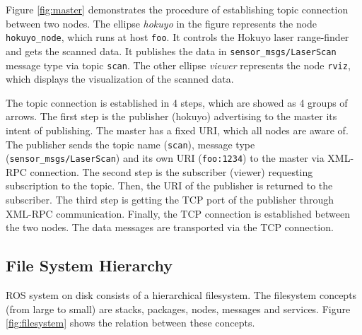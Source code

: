 \documentclass[a4paper, 10pt, conference]{ieeeconf}       %
\begin{document}
Figure \ref{fig:master} demonstrates the procedure of establishing topic connection between two nodes. The ellipse \emph{hokuyo} in the figure represents the node \texttt{hokuyo\_node}, which runs at host \texttt{foo}. It controls the Hokuyo laser range-finder and gets the scanned data. It publishes the data in \texttt{sensor\_msgs/LaserScan} message type via topic \texttt{scan}. The other ellipse \emph{viewer} represents the node \texttt{rviz}, which displays the visualization of the scanned data.

The topic connection is established in 4 steps, which are showed as 4 groups of arrows. The first step is the publisher (hokuyo) advertising to the master its intent of publishing. The master has a fixed URI, which all nodes are aware of. The publisher sends the topic name (\texttt{scan}), message type (\texttt{sensor\_msgs/LaserScan}) and its own URI (\texttt{foo:1234}) to the master via XML-RPC connection. The second step is the subscriber (viewer) requesting subscription to the topic. Then, the URI of the publisher is returned to the subscriber. The third step is getting the TCP port of the publisher through XML-RPC communication. Finally, the TCP connection is established between the two nodes. The data messages are transported via the TCP connection.

\subsection{File System Hierarchy}

ROS system on disk consists of a hierarchical filesystem. The filesystem concepts (from large to small) are stacks, packages, nodes, messages and services. Figure \ref{fig:filesystem} shows the relation between these concepts.
\end{document}
